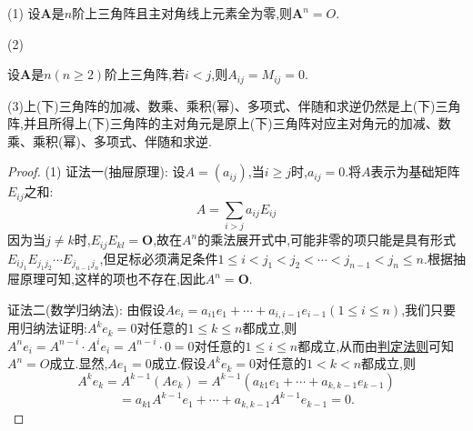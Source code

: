 \documentclass[../../main.tex]{subfiles}%
\begin{document}
\begin{proposition}[上三角阵性质]\label{proposition:上三角阵性质}
(1) 设\(\boldsymbol{A}\)是\(n\)阶上三角阵且主对角线上元素全为零,则\(\boldsymbol{A}^{n}=O\).

\hypertarget{proposition:上三角阵的性质第2条性质}{(2)}
设\(\boldsymbol{A}\)是\(n(n\geqslant 2)\)阶上三角阵,若\(i < j\),则\(A_{ij}=M_{ij}=0\).

(3)上(下)三角阵的加减、数乘、乘积(幂)、多项式、伴随和求逆仍然是上(下)三角阵,并且所得上(下)三角阵的主对角元是原上(下)三角阵对应主对角元的加减、数乘、乘积(幂)、多项式、伴随和求逆.
\end{proposition}
\begin{proof}

(1) {\color{blue}证法一(抽屉原理):}
设\(A=(a_{ij})\),当\(i\geqslant  j\)时,\(a_{ij} = 0\).将\(A\)表示为基础矩阵\(E_{ij}\)之和:
\[
A=\sum_{i>j}a_{ij}E_{ij}
\]
因为当\(j\neq k\)时,\(E_{ij}E_{kl}=\boldsymbol{O}\),故在\(A^{n}\)的乘法展开式中,可能非零的项只能是具有形式\(E_{ij_1}E_{j_1j_2}\cdots E_{j_{n-1}j_{n}}\),但足标必须满足条件\(1\leqslant i<j_1<j_2<\cdots <j_{n-1}<j_n\leqslant n\).根据抽屉原理可知,这样的项也不存在,因此\(A^{n}=\boldsymbol{O}\).

{\color{blue}证法二(数学归纳法):} 
由假设\(Ae_{i}=a_{i1}e_{1}+\cdots +a_{i, i - 1}e_{i - 1}(1\leqslant  i\leqslant  n)\),我们只要用归纳法证明:\(A^{k}e_{k}=0\)对任意的\(1\leqslant  k\leqslant  n\)都成立,则\(A^{n}e_{i}=A^{n-i}\cdot A^ie_i=A^{n-i}\cdot 0=0\)对任意的\(1\leqslant  i\leqslant  n\)都成立,从而由\hyperlink{proposition:矩阵相等的判定法则}{判定法则}可知\(A^{n}=O\)成立.显然,\(Ae_{1}=0\)成立.假设\(A^{k}e_{k}=0\)对任意的\(1 < k < n\)都成立,则
\[
A^{k}e_{k}=A^{k - 1}(Ae_{k})=A^{k - 1}(a_{k1}e_{1}+\cdots +a_{k, k - 1}e_{k - 1})
\]
\[
=a_{k1}A^{k - 1}e_{1}+\cdots +a_{k, k - 1}A^{k - 1}e_{k - 1}=0.
\]


\end{proof}
\end{document}
